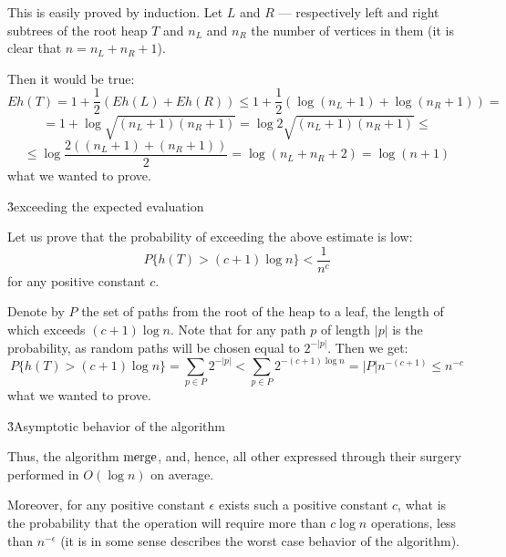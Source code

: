This is easily proved by induction. Let $L$ and $R$ --- respectively left and right subtrees of the root heap $T$ and $n_L$ and $n_R$ the number of vertices in them (it is clear that $n = n_L+n_R+1$).

Then it would be true:
$$ Eh(T) = 1 + \frac{1}{2}(Eh(L) + Eh(R)) \le 1 + \frac{1}{2}(\log(n_L+1) + \log(n_R+1)) = $$
$$ = 1 + \log \sqrt{ (n_L+1)(n_R+1) } = \log 2 \sqrt{ (n_L+1)(n_R+1) } \le $$
$$ \le \log \frac{ 2 ((n_L+1) + (n_R+1)) }{ 2 } = \log (n_L + n_R + 2) = \log(n+1) $$
what we wanted to prove.

\h3{exceeding the expected evaluation}

Let us prove that the probability of exceeding the above estimate is low:
$$ P\{ h(T) > (c+1) \log n \} < \frac{1}{n^c} $$
for any positive constant $c$.

Denote by $P$ the set of paths from the root of the heap to a leaf, the length of which exceeds $(c+1) \log n$. Note that for any path $p$ of length $|p|$ is the probability, as random paths will be chosen equal to $2^{-|p|}$. Then we get:
$$ P\{ h(T) > (c+1) \log n \} = \sum_{p \in P} 2^{-|p|} < \sum_{p \in P} 2^{-(c+1) \log n} = |P| n^{-(c+1)} \le n^{-c} $$
what we wanted to prove.

\h3{Asymptotic behavior of the algorithm}

Thus, the algorithm $\rm merge$, and, hence, all other expressed through their surgery performed in $O(\log n)$ on average.

Moreover, for any positive constant $\epsilon$ exists such a positive constant $c$, what is the probability that the operation will require more than $c \log n$ operations, less than $n^{-\epsilon}$ (it is in some sense describes the worst case behavior of the algorithm).
